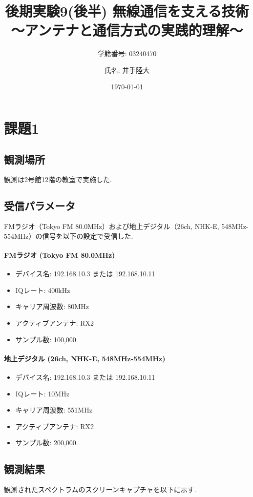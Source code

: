 \documentclass[a4paper, twocolumn]{article} %
\title{後期実験9(後半) 無線通信を支える技術
～アンテナと通信方式の実践的理解～}
\author{学籍番号: 03240470 \and 氏名: 井手陸大}
\date{\today}
\begin{document}
\maketitle

\section{課題1}
\subsection{観測場所}
観測は2号館12階の教室で実施した.

\subsection{受信パラメータ}
FMラジオ（Tokyo FM 80.0MHz）および地上デジタル（26ch, NHK-E, 548MHz-554MHz）の信号を以下の設定で受信した.

\paragraph{FMラジオ (Tokyo FM 80.0MHz)}
\begin{itemize}
    \item デバイス名: 192.168.10.3 または 192.168.10.11
    \item IQレート: 400kHz
    \item キャリア周波数: 80MHz
    \item アクティブアンテナ: RX2
    \item サンプル数: 100,000
\end{itemize}

\paragraph{地上デジタル (26ch, NHK-E, 548MHz-554MHz)}
\begin{itemize}
    \item デバイス名: 192.168.10.3 または 192.168.10.11
    \item IQレート: 10MHz
    \item キャリア周波数: 551MHz
    \item アクティブアンテナ: RX2
    \item サンプル数: 200,000
\end{itemize}

\subsection{観測結果}
観測されたスペクトラムのスクリーンキャプチャを以下に示す.
\end{document}
